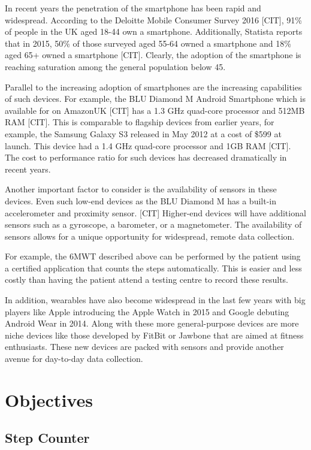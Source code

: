             In recent years the penetration of the smartphone has been rapid and widespread. According to the Deloitte Mobile Consumer Survey 2016 [CIT], 91\% of people in the UK aged 18-44 own a smartphone. Additionally, Statista reports that in 2015, 50\% of those surveyed aged 55-64 owned a smartphone and 18\% aged 65+ owned a smartphone [CIT]. Clearly, the adoption of the smartphone is reaching saturation among the general population below 45.

            Parallel to the increasing adoption of smartphones are the increasing capabilities of such devices. For example, the BLU Diamond M Android Smartphone which is available for  on AmazonUK [CIT] has a 1.3 GHz quad-core processor and 512MB RAM [CIT]. This is comparable to flagship devices from earlier years, for example, the Samsung Galaxy S3 released in May 2012 at a cost of \$599 at launch. This device had a 1.4 GHz quad-core processor and 1GB RAM [CIT]. The cost to performance ratio for such devices has decreased dramatically in recent years.

            Another important factor to consider is the availability of sensors in these devices. Even such low-end devices as the BLU Diamond M has a built-in accelerometer and proximity sensor. [CIT] Higher-end devices will have additional sensors such as a gyroscope, a barometer, or a magnetometer. The availability of sensors allows for a unique opportunity for widespread, remote data collection. 

            For example, the 6MWT described above can be performed by the patient using a certified application that counts the steps automatically. This is easier and less costly than having the patient attend a testing centre to record these results.

            In addition, wearables have also become widespread in the last few years with big players like Apple introducing the Apple Watch in 2015 and Google debuting Android Wear in 2014. Along with these more general-purpose devices are more niche devices like those developed by FitBit or Jawbone that are aimed at fitness enthusiasts. These new devices are packed with sensors and provide another avenue for day-to-day data collection.

    \chapter{Objectives}

        \section{Step Counter}

